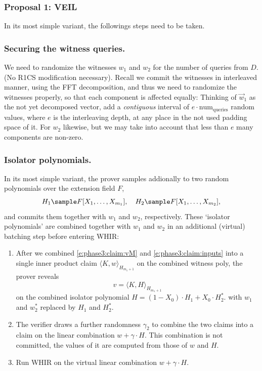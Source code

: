 
\subsubsection{Proposal 1: VEIL}

In its most simple variant, the followings steps need to be taken.

\subsubsection{Securing the witness queries.}
We need to randomize the witnesses $w_1$ and $w_2$ for the number of queries from $D$. (No R1CS modification necessary). 
Recall we commit the witnesses in interleaved manner, using the FFT decomposition, and thus we need to randomize the witnesses properly, so that each component is affected equally:
Thinking of $\vec w_1$ as the not yet decomposed vector, add a \textit{contiguous} interval of $e \cdot \text{num}_\text{queries}$  random values, where $e$ is the interleaving depth, at any place in the not used padding space of it. 
For $w_2$ likewise, but we may take into account that less than $e$ many components are non-zero.


\subsubsection{Isolator polynomials.}

In its most simple variant, the prover samples addionally to two random polynomials over the extension field $F$,
\[
H_1 \sample F[X_1, \ldots, X_{m_1}], \quad H_2 \sample F[X_1,\ldots, X_{m_2}],
\]
and commits them together with $w_1$ and $w_2$, respectively. 
These `isolator polynomials' are combined together with $w_1$ and $w_2$ in an additional (virtual) batching step before entering WHIR:
\begin{enumerate}
    \item 
    After we combined \eqref{e:phase3:claim:vM} and \eqref{e:phase3:claim:inputs}  into a single inner product claim $\langle K, w\rangle_{H_{m_1 + 1}}$ on the combined witness poly, the prover reveals 
    \[
    v = \langle K, H \rangle_{H_{m_1 + 1}}
    \]
    on the combined isolator polynomial $H = (1 - X_0 ) \cdot H_1 + X_0 \cdot H_2^*$.
    with $w_1$ and $w_2^*$ replaced by $H_1$ and $H_2^*$.  
    \item 
    The verifier draws a further randomness $\gamma_2$ to combine the two claims into a claim on the linear combination $w + \gamma \cdot H$. 
    This combination is not committed, the values of it are computed from those of $w$ and $H$. 
    \item 
    Run WHIR on the virtual linear combination $w + \gamma \cdot H$.
\end{enumerate}

